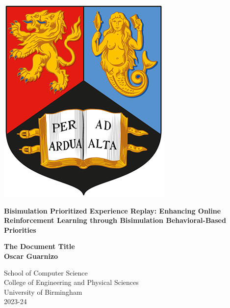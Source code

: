 
\thispagestyle{empty}

\begin{spacing}{2}
	\begin{center}
		\includegraphics[scale = 1.5]{Preamble/BirmCrest.png}
	\end{center}
	\vspace{10mm}
	\begin{center}
		\textbf{\Large Bisimulation Prioritized Experience Replay: Enhancing Online Reinforcement Learning through Bisimulation Behavioral-Based Priorities}
		\vspace{10mm}
	\end{center}
	\begin{center}
		\textbf{\large The Document Title}
		\vspace{20mm}
		\\\textbf{\Large Oscar Guarnizo}
		\vspace{20mm}
	\end{center}
	\begin{center}
		{\large School of Computer Science}
		\\ {\large College of Engineering and Physical Sciences}
		\\ {\large University of Birmingham}
		\\ {\large 2023-24}
	\end{center}
\end{spacing}


